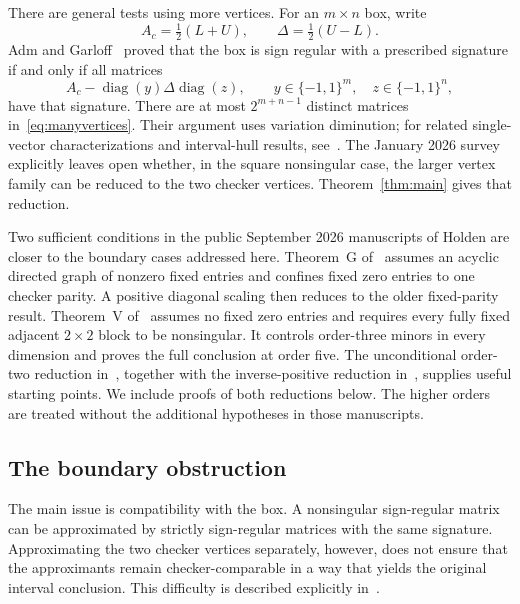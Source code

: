 \documentclass[10pt,a4paper]{article}
\theoremstyle{definition}
\theoremstyle{remark}
\numberwithin{equation}{section}
\DeclareMathOperator{\diag}{diag}
\begin{document}
There are general tests using more vertices. For an $m\times n$ box,
write
\[
 A_c=\tfrac12(L+U),\qquad \Delta=\tfrac12(U-L).
\]
Adm and Garloff~\cite[Theorem~3.1]{AdmGarloff2025} proved that the box
is sign regular with a prescribed signature if and only if all matrices
\begin{equation}\label{eq:manyvertices}
 A_c-\diag(y)\Delta\diag(z),
 \qquad y\in\{-1,1\}^m,\quad z\in\{-1,1\}^n,
\end{equation}
have that signature. There are at most $2^{m+n-1}$ distinct matrices
in~\eqref{eq:manyvertices}. Their argument uses variation diminution;
for related single-vector characterizations and interval-hull results,
see~\cite{ChoudhuryKannanKhare2021,ChoudhuryYadav2025}.
The January 2026 survey~\cite{AdmGarloff2026} explicitly leaves open
whether, in the square nonsingular case, the larger vertex family can
be reduced to the two checker vertices. Theorem~\ref{thm:main} gives
that reduction.

Two sufficient conditions in the public September 2026 manuscripts of
Holden are closer to the boundary cases addressed here.
Theorem~G of~\cite{HoldenGraph2026} assumes an acyclic directed graph
of nonzero fixed entries and confines fixed zero entries to one checker
parity. A positive diagonal scaling then reduces to the older
fixed-parity result. Theorem~V of~\cite{HoldenFive2026} assumes no fixed
zero entries and requires every fully fixed adjacent $2\times2$ block
to be nonsingular. It controls order-three minors in every dimension
and proves the full conclusion at order five. The unconditional
order-two reduction in~\cite{HoldenTwo2026}, together with the
inverse-positive reduction in~\cite{HoldenGraph2026}, supplies useful
starting points. We include proofs of both reductions below. The higher
orders are treated without the additional hypotheses in those manuscripts.

\subsection{The boundary obstruction}

The main issue is compatibility with the box. A nonsingular
sign-regular matrix can be approximated by strictly sign-regular
matrices with the same signature. Approximating the two checker
vertices separately, however, does not ensure that the approximants
remain checker-comparable in a way that yields the original interval
conclusion. This difficulty is described explicitly
in~\cite{AdmGarloff2026}.
\end{document}
